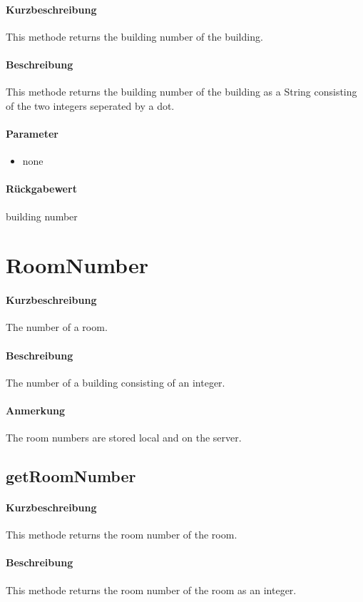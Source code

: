 \paragraph*{Kurzbeschreibung}
This methode returns the building number of the building.
\paragraph*{Beschreibung}
This methode returns the building number of the building as a String consisting of the two integers seperated by a dot.
\paragraph*{Parameter}
\begin{itemize}
    \item none
\end{itemize}
\paragraph*{Rückgabewert}
building number


\section{RoomNumber}
\paragraph*{Kurzbeschreibung}
The number of a room.
\paragraph*{Beschreibung}
The number of a building consisting of an integer.
\paragraph*{Anmerkung}
The room numbers are stored local and on the server.

\subsection{getRoomNumber}%
\paragraph*{Kurzbeschreibung}
This methode returns the room number of the room.
\paragraph*{Beschreibung}
This methode returns the room number of the room as an integer.
